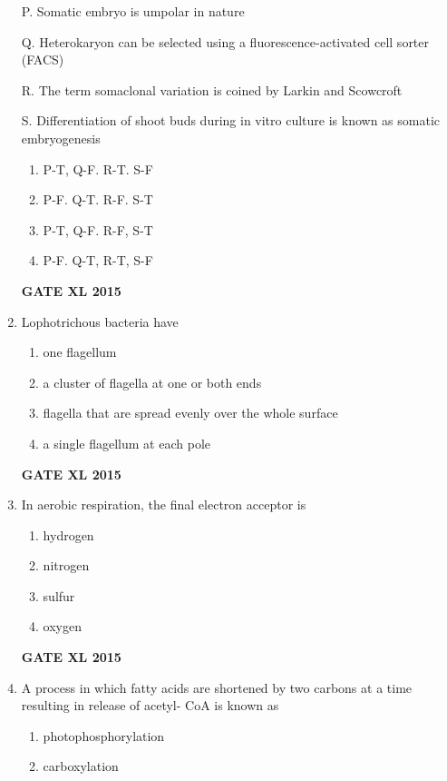 \documentclass[journal,12pt,onecolumn]{IEEEtran}
\begin{document}
\begin{enumerate}
P. Somatic embryo is umpolar in nature

Q. Heterokaryon can be selected using a fluorescence-activated cell sorter (FACS)

R. The term somaclonal variation is coined by Larkin and Scowcroft

S. Differentiation of shoot buds during in vitro culture is known as somatic embryogenesis
    \begin{enumerate}
            \item  P-T, Q-F. R-T. S-F
	    \item  P-F. Q-T. R-F. S-T
	    \item P-T, Q-F. R-F, S-T
            \item P-F. Q-T, R-T, S-F
    \end{enumerate}
\begin{flushright}\textbf{GATE XL 2015}\end{flushright}
\item Lophotrichous bacteria have
    \begin{enumerate}
            \item one flagellum
	    \item a cluster of flagella at one or both ends
	    \item flagella that are spread evenly over the whole surface
            \item a single flagellum at each pole
    \end{enumerate}
\begin{flushright}\textbf{GATE XL 2015}\end{flushright}
\item In aerobic respiration, the final electron acceptor is
    \begin{enumerate}
            \item hydrogen
	    \item nitrogen
	    \item sulfur
            \item oxygen
    \end{enumerate}
\begin{flushright}\textbf{GATE XL 2015}\end{flushright}
\item A process in which fatty acids are shortened by two carbons at a time resulting in release of acetyl-
CoA is known as
    \begin{enumerate}
            \item photophosphorylation
	    \item carboxylation

\end{enumerate}
\end{enumerate}
\end{document}
